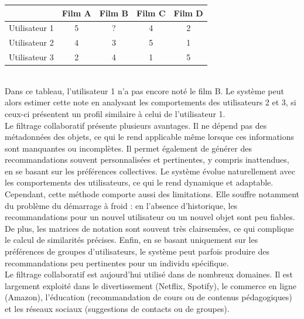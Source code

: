 \documentclass{article}
\begin{document}
\begin{center}
    \begin{tabular}{|c|c|c|c|c|}
        \hline
                      & Film A & Film B & Film C & Film D \\
        \hline
        Utilisateur 1 & 5      & ?      & 4      & 2      \\
        \hline
        Utilisateur 2 & 4      & 3      & 5      & 1      \\
        \hline
        Utilisateur 3 & 2      & 4      & 1      & 5      \\
        \hline
    \end{tabular}
\end{center}
$ $\\
Dans ce tableau, l’utilisateur 1 n’a pas encore noté le film B. Le système peut alors estimer cette note en analysant les comportements
des utilisateurs 2 et 3, si ceux-ci présentent un profil similaire à celui de l’utilisateur 1.
$ $\\
Le filtrage collaboratif présente plusieurs avantages. Il ne dépend pas des métadonnées des objets, ce qui le rend applicable 
même lorsque ces informations sont manquantes ou incomplètes. Il permet également de générer des recommandations souvent 
personnalisées et pertinentes, y compris inattendues, en se basant sur les préférences collectives. Le système évolue 
naturellement avec les comportements des utilisateurs, ce qui le rend dynamique et adaptable.
$ $\\
Cependant, cette méthode comporte aussi des limitations. Elle souffre notamment du problème du démarrage à froid : 
en l’absence d’historique, les recommandations pour un nouvel utilisateur ou un nouvel objet sont peu fiables. 
De plus, les matrices de notation sont souvent très clairsemées, ce qui complique le calcul de similarités précises. 
Enfin, en se basant uniquement sur les préférences de groupes d’utilisateurs, le système peut parfois produire des 
recommandations peu pertinentes pour un individu spécifique.
$ $\\
Le filtrage collaboratif est aujourd’hui utilisé dans de nombreux domaines. Il est largement exploité dans le divertissement 
(Netflix, Spotify), le commerce en ligne (Amazon), l’éducation (recommandation de cours ou de contenus pédagogiques) et 
les réseaux sociaux (suggestions de contacts ou de groupes).
\end{document}
